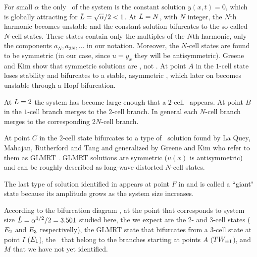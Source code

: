 For small $\alpha$ the only \eqv\ of the system is the constant solution $y(x,t)=0$,
which is globally attracting 
for $\tilde{L}=\sqrt{\alpha}/2<1$. At $\tilde{L}=N$, with $N$ integer, 
the $N$th harmonic becomes unstable and the constant solution
bifurcates to the so called $N$-cell states. 
These states contain only the multiples of the $N$th
harmonic, {\ie} only the components $a_N,a_{2N},...$ in our notation. 
Moreover, the $N$-cell states are found to be symmetric (in our case, since $u=y_x$ they will be
antisymmetric). 
Greene and Kim show that symmetric solutions are \eqva, not \reqva. 
At point $A$ in  the $1$-cell state loses stability
and bifurcates to a stable, 
asymmetric \reqv, which later on becomes unstable through a Hopf bifurcation. 

At $\tilde{L}=2$ the system has become large enough that a $2$-cell \eqv\ appears. At point $B$
in  the $1$-cell branch merges to the $2$-cell branch. In general each $N$-cell branch merges to the corresponding $2N$-cell branch.

At point $C$ in  the $2$-cell state bifurcates to a type of 
\eqv\ solution
found by La Quey, Mahajan, Rutherford and Tang and generalized by Greene and Kim who refer to them as GLMRT \eqva. GLMRT solutions are symmetric 
($u(x)$ is antisymmetric)
and can be roughly described as long-wave distorted $N$-cell states.

The last type of solution identified in  appears at point $F$ 
in  and is called a
``giant" state because its amplitude grows as the system size increases.

According to the bifurcation diagram , 
at the point that corresponds to system size $\tilde{L}=\alpha^{1/2}/2=3.501$
studied here,
the {\eqva} we expect are the $2$- and $3$-cell states ($E_{2}$ and $E_{3}$ respectivelly), the GLMRT state that bifurcates from a $3$-cell state at point $I$ ($E_{1}$),
the \reqva\ that belong to the branches starting at points $A$ ($TW_{\pm1}$),
and $M$ that we have not  yet identified.
 
